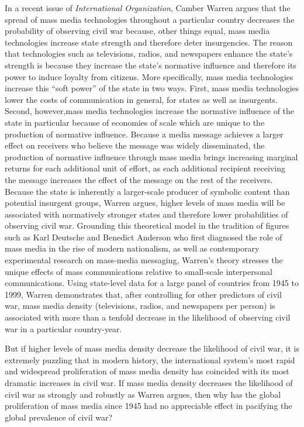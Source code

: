 \documentclass[11pt,article,oneside]{memoir}
\begin{document}
In a recent issue of \emph{International Organization}, Camber Warren
argues that the spread of mass media technologies throughout a
particular country decreases the probability of observing civil war
because, other things equal, mass media technologies increase state
strength and therefore deter insurgencies. The reason that technologies
such as televisions, radios, and newspapers enhance the state's strength
is because they increase the state's normative influence and therefore
its power to induce loyalty from citizens. More specifically, mass media
technologies increase this ``soft power'' of the state in two ways.
First, mass media technologies lower the costs of communication in
general, for states as well as insurgents. Second, however,mass media
technologies increase the normative influence of the state in particular
because of economies of scale which are unique to the production of
normative influence. Because a media message achieves a larger effect on
receivers who believe the message was widely disseminated, the
production of normative influence through mass media brings increasing
marginal returns for each additional unit of effort, as each additional
recipient receiving the message increases the effect of the message on
the rest of the receivers. Because the state is inherently a
larger-scale producer of symbolic content than potential insurgent
groups, Warren argues, higher levels of mass media will be associated
with normatively stronger states and therefore lower probabilities of
observing civil war. Grounding this theoretical model in the tradition
of figures such as Karl Deutsche and Benedict Anderson who first
diagnosed the role of mass media in the rise of modern nationalism, as
well as contemporary experimental research on mass-media messaging,
Warren's theory stresses the unique effects of mass communications
relative to small-scale interpersonal communications. Using state-level
data for a large panel of countries from 1945 to 1999, Warren
demonstrates that, after controlling for other predictors of civil war,
mass media density (televisions, radios, and newspapers per person) is
associated with more than a tenfold decrease in the likelihood of
observing civil war in a particular country-year.

But if higher levels of mass media density decrease the likelihood of
civil war, it is extremely puzzling that in modern history, the
international system's most rapid and widespread proliferation of mass
media density has coincided with its most dramatic increases in civil
war. If mass media density decreases the likelihood of civil war as
strongly and robustly as Warren argues, then why has the global
proliferation of mass media since 1945 had no appreciable effect in
pacifying the global prevalence of civil war?
\end{document}
